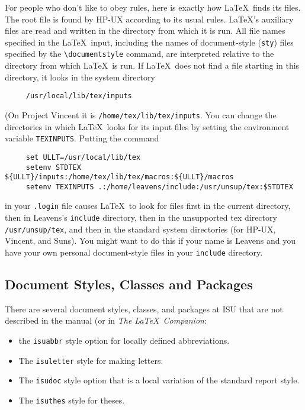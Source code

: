 \documentclass{article}
\begin{document}
For people who don't like to obey rules, 
here is exactly how \LaTeX\ finds its
files.  The root file is found by HP-UX according to its usual rules.
\LaTeX's auxiliary files are read and written in the directory from
which it is run.  All file names specified in the \LaTeX\ input,
including the names of document-style ({\tt sty}) files specified by
the \hbox{\verb|\documentstyle|} command, are interpreted relative to
the directory from which \LaTeX\ is run.  If \LaTeX\ does not find a
file starting in this directory, it looks in the system directory
\begin{verbatim}
     /usr/local/lib/tex/inputs
\end{verbatim}
(On Project Vincent it is \hbox{\verb|/home/tex/lib/tex/inputs|}.
You can change the directories in
which \LaTeX\ looks for its input files by setting the environment
variable \mbox{\tt TEXINPUTS}.  Putting the command
\begin{verbatim}
     set ULLT=/usr/local/lib/tex
     setenv STDTEX ${ULLT}/inputs:/home/tex/lib/tex/macros:${ULLT}/macros
     setenv TEXINPUTS .:/home/leavens/include:/usr/unsup/tex:$STDTEX
\end{verbatim}
in your \mbox{\tt .login} file causes \LaTeX\ to look for files first
in the current directory, then in Leavens's {\tt include} directory,
then in the unsupported tex directory {\tt /usr/unsup/tex}, and
then in the standard system directories (for HP-UX, Vincent, and Suns).
You might want to do this if your name
is Leavens and you have your own personal document-style files in your
{\tt include} directory. 

\subsection{Document Styles, Classes and Packages}

There are several document styles, classes, and packages
at ISU that are not described in the manual (or in {\em The \LaTeX\ Companion}: 
\begin{itemize}
\item the \mbox{\tt isuabbr} style option for
locally defined abbreviations.

\item The \mbox{\tt isuletter} style for making letters.

\item The {\tt isudoc} style option that is a local variation of the
standard report style.

\item The {\tt isuthes} style for theses.
\end{itemize} 
\end{document}
